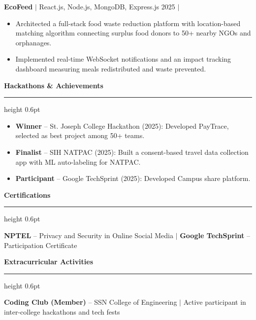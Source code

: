 \documentclass[10pt, a4paper]{article}
\newcommand{\sectionhead}[1]{%
    \vspace{4pt}%
    {\fontsize{11pt}{13pt}\selectfont\color{sectioncolor}\textbf{#1}}%
    \vspace{1.5pt}%
    {\color{rulecolor}\hrule height 0.6pt}%
    \vspace{3pt}%
}
\newcommand{\projecttitle}[3]{%
    \noindent\textbf{\color{sectioncolor}#1} {\color{subtext}$|$ #2} \hfill {\color{subtext}#3}%
}
\begin{document}
\vspace{2pt}
\projecttitle{EcoFeed}{React.js, Node.js, MongoDB, Express.js}{2025 $|$ \href{https://github.com/jeeva2470041}{\color{accent}\faGithub}}
\begin{itemize}
    \item Architected a full-stack food waste reduction platform with location-based matching algorithm connecting surplus food donors to 50+ nearby NGOs and orphanages.
    \item Implemented real-time WebSocket notifications and an impact tracking dashboard measuring meals redistributed and waste prevented.
\end{itemize}

\sectionhead{Hackathons \& Achievements}

\begin{itemize}
    \item \textbf{\color{sectioncolor}Winner} -- St. Joseph College Hackathon (2025): Developed PayTrace, selected as best project among 50+ teams.
    \item \textbf{\color{sectioncolor}Finalist} -- SIH NATPAC (2025): Built a consent-based travel data collection app with ML auto-labeling for NATPAC.
    \item \textbf{\color{sectioncolor}Participant} -- Google TechSprint (2025): Developed Campus share platform.
\end{itemize}

\sectionhead{Certifications}

\textbf{\color{sectioncolor}NPTEL} -- Privacy and Security in Online Social Media $|$ \textbf{\color{sectioncolor}Google TechSprint} -- Participation Certificate

\sectionhead{Extracurricular Activities}

\textbf{\color{sectioncolor}Coding Club (Member)} -- SSN College of Engineering $|$ Active participant in inter-college hackathons and tech fests
\end{document}
